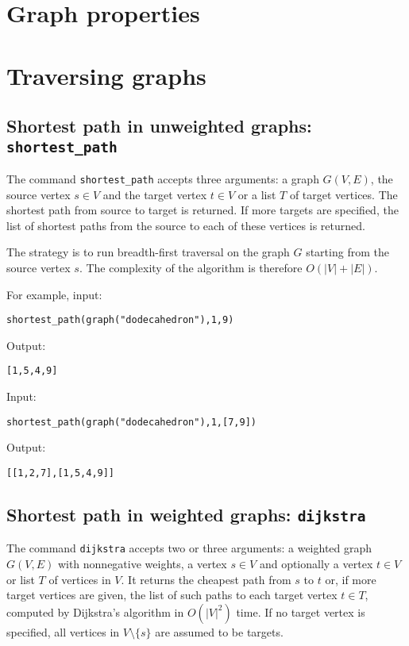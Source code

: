 \documentclass[a4paper,11pt]{article}
\begin{document}
\section{Graph properties}

\section{Traversing graphs}

\subsection{Shortest path in unweighted graphs: {\tt shortest\_path}}

The command {\tt shortest\_path} accepts three arguments: a graph $ G(V,E) $, the source vertex $ s\in V $ and the target vertex $ t\in V $ or a list $ T $ of target vertices. The shortest path from source to target is returned. If more targets are specified, the list of shortest paths from the source to each of these vertices is returned.

The strategy is to run breadth-first traversal on the graph $ G $ starting from the source vertex $ s $. The complexity of the algorithm is therefore $ O(|V|+|E|) $.

For example, input:
\begin{center}
  \tt shortest\_path(graph("dodecahedron"),1,9)
\end{center}
Output:
\begin{center}
  \tt [1,5,4,9]
\end{center}
Input:
\begin{center}
  \tt shortest\_path(graph("dodecahedron"),1,[7,9])
\end{center}
Output:
\begin{center}
  \tt [[1,2,7],[1,5,4,9]]
\end{center}

\subsection{Shortest path in weighted graphs: {\tt dijkstra}}

The command {\tt dijkstra} accepts two or three arguments: a weighted graph $ G(V,E) $ with nonnegative weights, a vertex $ s\in V $ and optionally a vertex $ t\in V $ or list $ T $ of vertices in $ V $. It returns the cheapest path from $ s $ to $ t $ or, if more target vertices are given, the list of such paths to each target vertex $ t\in T $, computed by Dijkstra's algorithm in $ O(|V|^2) $ time. If no target vertex is specified, all vertices in $ V\setminus\{s\} $ are assumed to be targets.
\end{document}
